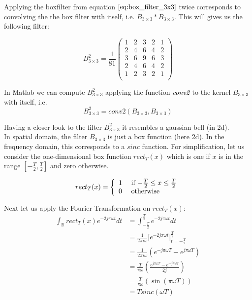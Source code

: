 \documentclass{paper}
\begin{document}
Applying the boxfilter from equation $\ref{eq:box_filter_3x3}$ twice corresponds to convolving the the box filter with itself, i.e. $B_{3 \times 3} \ast B_{3 \times 3}$. This will gives us the following filter:

\begin{equation}
B_{3 \times 3}^2 = 
\frac{1}{81}
\begin{pmatrix}
1 & 2 & 3 & 2 & 1 \\
2 & 4 & 6 & 4 & 2 \\
3 & 6 & 9 & 6 & 3 \\
2 & 4 & 6 & 4 & 2 \\
1 & 2 & 3 & 2 & 1 \\
\end{pmatrix}
\label{eq:box_filter_3x3_twice}
\end{equation}

In Matlab we can compute $B_{3 \times 3}^2$ applying the function $\emph{conv2}$ to the kernel $B_{3 \times 3}$ with itself, i.e.
\begin{equation}
    B_{3 \times 3}^2 = conv2(B_{3 \times 3},B_{3 \times 3})
\end{equation}

Having a closer look to the filter $B_{3 \times 3}^2$ it resembles a gaussian bell (in 2d). \\ 
 
In spatial domain, the filter $B_{3 \times 3}$ is just a box function (here 2d). In the frequency domain, this corresponds to a $sinc$ function. For simplification, let us consider the one-dimensional box function $rect_T(x)$ which is one if $x$ is in the range $\left[-\frac{T}{2}, \frac{T}{2}\right]$ and zero otherwise.

\begin{equation}
rect_T(x) = \left\{ \begin{array}{rl}
1 &\mbox{ if $ - \frac{T}{2} \leq x \leq \frac{T}{2}$} \\
0 &\mbox{ otherwise}
\end{array} \right.
\end{equation}

Next let us apply the Fourier Transformation on $rect_T(x)$:
\begin{align}
    \int_{\mathbb{R}} rect_T(x) e^{-2j\pi \omega t } dt
    &= \int_{-\frac{T}{2}}^{\frac{T}{2}} e^{-2j\pi \omega t } dt \\
    &= \frac{1}{2 \pi i \omega} [ e^{-2j\pi \omega t } |_{t=-\frac{T}{2}}^{\frac{T}{2}} \\
    &= \frac{1}{2 \pi i  \omega} (e^{-j\pi \omega T} - e^{j\pi \omega T}) \\
    &= \frac{T}{\pi \omega} (\frac{e^{j\pi \omega T} - e^{-j\pi \omega T}}{2j}) \\
    &= \frac{T}{\pi \omega} (\sin(\pi \omega T)) \\
    &= T sinc(\omega T) 
\label{eq:sincderi}
\end{align}
\end{document}
